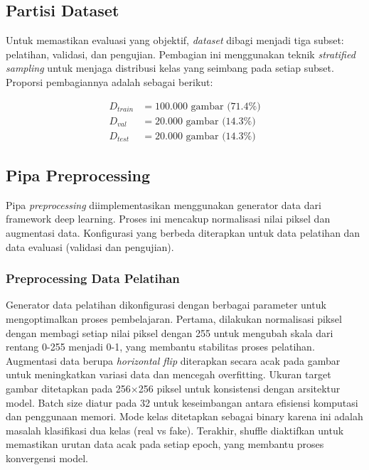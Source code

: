\subsection{Partisi Dataset}

Untuk memastikan evaluasi yang objektif, \textit{dataset} dibagi menjadi tiga subset: pelatihan, validasi, dan pengujian. Pembagian ini menggunakan teknik \textit{stratified sampling} untuk menjaga distribusi kelas yang seimbang pada setiap subset. Proporsi pembagiannya adalah sebagai berikut:

\begin{align}
D_{train} &= 100.000 \text{ gambar (71.4\%)} \\
D_{val} &= 20.000 \text{ gambar (14.3\%)} \\
D_{test} &= 20.000 \text{ gambar (14.3\%)}
\end{align}

\subsection{Pipa Preprocessing}

Pipa \textit{preprocessing} diimplementasikan menggunakan generator data dari framework deep learning. Proses ini mencakup normalisasi nilai piksel dan augmentasi data. Konfigurasi yang berbeda diterapkan untuk data pelatihan dan data evaluasi (validasi dan pengujian).

\subsubsection{Preprocessing Data Pelatihan}

Generator data pelatihan dikonfigurasi dengan berbagai parameter untuk mengoptimalkan proses pembelajaran. Pertama, dilakukan normalisasi piksel dengan membagi setiap nilai piksel dengan 255 untuk mengubah skala dari rentang 0-255 menjadi 0-1, yang membantu stabilitas proses pelatihan. Augmentasi data berupa \textit{horizontal flip} diterapkan secara acak pada gambar untuk meningkatkan variasi data dan mencegah overfitting. Ukuran target gambar ditetapkan pada 256×256 piksel untuk konsistensi dengan arsitektur model. Batch size diatur pada 32 untuk keseimbangan antara efisiensi komputasi dan penggunaan memori. Mode kelas ditetapkan sebagai binary karena ini adalah masalah klasifikasi dua kelas (real vs fake). Terakhir, shuffle diaktifkan untuk memastikan urutan data acak pada setiap epoch, yang membantu proses konvergensi model.

